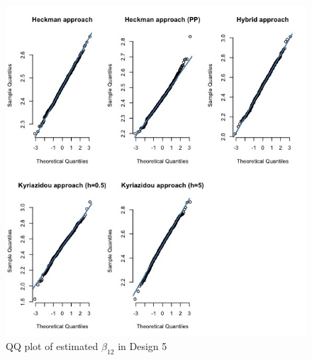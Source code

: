\begin{figure}[htbp]
    \begin{adjustwidth}{-.5in}{-.5in}
        \centerline{\includegraphics[scale=.4]{content/Figures/QQ_beta_12_Design5.png}}
        \caption{\footnotesize{QQ plot of estimated $\beta_{12}$ in Design 5}}
        \label{QQ_beta_12_Design5}
    \end{adjustwidth}
\end{figure}    
